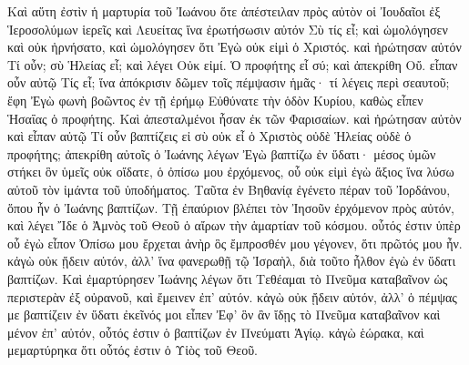 \begin{pages}
\begin{Rightside}
		 Καὶ αὕτη ἐστὶν ἡ μαρτυρία τοῦ Ἰωάνου ὅτε ἀπέστειλαν πρὸς αὐτὸν οἱ Ἰουδαῖοι ἐξ Ἱεροσολύμων ἱερεῖς καὶ Λευείτας ἵνα ἐρωτήσωσιν αὐτόν Σὺ τίς εἶ; καὶ ὡμολόγησεν καὶ οὐκ ἠρνήσατο, καὶ ὡμολόγησεν ὅτι Ἐγὼ οὐκ εἰμὶ ὁ Χριστός. καὶ ἠρώτησαν αὐτόν Τί οὖν; σὺ Ἡλείας εἶ; καὶ λέγει Οὐκ εἰμί. Ὁ προφήτης εἶ σύ; καὶ ἀπεκρίθη Οὔ. εἶπαν οὖν αὐτῷ Τίς εἶ; ἵνα ἀπόκρισιν δῶμεν τοῖς πέμψασιν ἡμᾶς· τί λέγεις περὶ σεαυτοῦ; ἔφη Ἐγὼ φωνὴ βοῶντος ἐν τῇ ἐρήμῳ Εὐθύνατε τὴν ὁδὸν Κυρίου, καθὼς εἶπεν Ἡσαΐας ὁ προφήτης. Καὶ ἀπεσταλμένοι ἦσαν ἐκ τῶν Φαρισαίων. καὶ ἠρώτησαν αὐτὸν καὶ εἶπαν αὐτῷ Τί οὖν βαπτίζεις εἰ σὺ οὐκ εἶ ὁ Χριστὸς οὐδὲ Ἡλείας οὐδὲ ὁ προφήτης; ἀπεκρίθη αὐτοῖς ὁ Ἰωάνης λέγων Ἐγὼ βαπτίζω ἐν ὕδατι· μέσος ὑμῶν στήκει ὃν ὑμεῖς οὐκ οἴδατε, ὁ ὀπίσω μου ἐρχόμενος, οὗ οὐκ εἰμὶ ἐγὼ ἄξιος ἵνα λύσω αὐτοῦ τὸν ἱμάντα τοῦ ὑποδήματος. Ταῦτα ἐν Βηθανίᾳ ἐγένετο πέραν τοῦ Ἰορδάνου, ὅπου ἦν ὁ Ἰωάνης βαπτίζων. Τῇ ἐπαύριον βλέπει τὸν Ἰησοῦν ἐρχόμενον πρὸς αὐτόν, καὶ λέγει Ἴδε ὁ Ἀμνὸς τοῦ Θεοῦ ὁ αἴρων τὴν ἁμαρτίαν τοῦ κόσμου. οὗτός ἐστιν ὑπὲρ οὗ ἐγὼ εἶπον Ὀπίσω μου ἔρχεται ἀνὴρ ὃς ἔμπροσθέν μου γέγονεν, ὅτι πρῶτός μου ἦν. κἀγὼ οὐκ ᾔδειν αὐτόν, ἀλλ’ ἵνα φανερωθῇ τῷ Ἰσραὴλ, διὰ τοῦτο ἦλθον ἐγὼ ἐν ὕδατι βαπτίζων. Καὶ ἐμαρτύρησεν Ἰωάνης λέγων ὅτι Τεθέαμαι τὸ Πνεῦμα καταβαῖνον ὡς περιστερὰν ἐξ οὐρανοῦ, καὶ ἔμεινεν ἐπ’ αὐτόν. κἀγὼ οὐκ ᾔδειν αὐτόν, ἀλλ’ ὁ πέμψας με βαπτίζειν ἐν ὕδατι ἐκεῖνός μοι εἶπεν Ἐφ’ ὃν ἂν ἴδῃς τὸ Πνεῦμα καταβαῖνον καὶ μένον ἐπ’ αὐτόν, οὗτός ἐστιν ὁ βαπτίζων ἐν Πνεύματι Ἁγίῳ. κἀγὼ ἑώρακα, καὶ μεμαρτύρηκα ὅτι οὗτός ἐστιν ὁ Υἱὸς τοῦ Θεοῦ.
		\pend
		\pstart		

\end{Rightside}
\end{pages}
